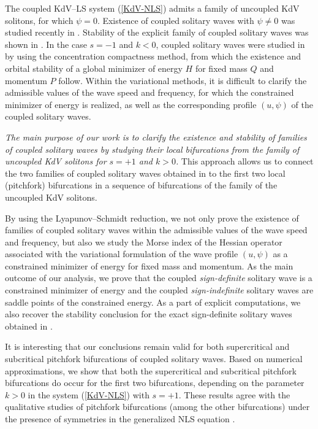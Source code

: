 \documentclass[12pt,reqno]{amsart}
\numberwithin{equation}{section}
\begin{document}
The coupled KdV--LS system (\ref{KdV-NLS}) admits a family of uncoupled KdV solitons, for which $\psi = 0$. Existence of coupled solitary waves with 
$\psi \neq 0$ was studied recently in \cite{Anco,Nguyen3}. Stability 
of the explicit family of coupled solitary waves was shown in \cite{Chen}. 
In the case $s = -1$ and $k < 0$, coupled solitary waves 
were studied in \cite{Pava,Albert13,Pava2006} by using the concentration compactness method, from which the existence and orbital stability of a global minimizer of energy \(H\) for fixed mass \(Q\) and momentum \(P\) follow. 
Within the variational methods, it is difficult to clarify the admissible 
values of the wave speed and frequency, for which the constrained minimizer of energy is realized, as well as the corresponding profile $(u,\psi)$ of the coupled solitary waves.

{\em The main purpose of our work is to clarify the existence and stability 
of families of coupled solitary waves by studying their local bifurcations from 
the family of uncoupled KdV solitons for $s = +1$ and $k > 0$.} This approach 
allows us to connect the two families of coupled solitary waves obtained 
in \cite{Anco} to the first two local (pitchfork) bifurcations in a sequence of 
bifurcations of the family of the uncoupled KdV solitons.  

By using the Lyapunov–Schmidt reduction, we not only prove the existence of families of coupled solitary waves within the admissible values of the wave speed and frequency, but also we study the Morse index of the Hessian operator associated with the variational formulation of the wave profile $(u,\psi)$ as a constrained minimizer of energy for fixed mass and momentum. As the main outcome of our analysis, we prove that the coupled {\em sign-definite} solitary wave is 
a constrained minimizer of energy and the coupled {\em sign-indefinite} solitary waves are saddle points of the constrained energy. As a part of explicit computations, we also recover the stability conclusion for the exact sign-definite solitary waves obtained in \cite{Chen}. 

It is interesting that our conclusions remain valid for both supercritical and subcritical pitchfork bifurcations of coupled solitary waves. Based on numerical approximations, we show that both the supercritical and subcritical pitchfork 
bifurcations do occur for the first two bifurcations, depending on the parameter 
$k > 0$ in the system (\ref{KdV-NLS}) with $s = +1$. These results agree with the qualitative 
studies of pitchfork bifurcations (among the other bifurcations) under the presence of symmetries in the generalized NLS equation \cite{Yang}.
\end{document}

